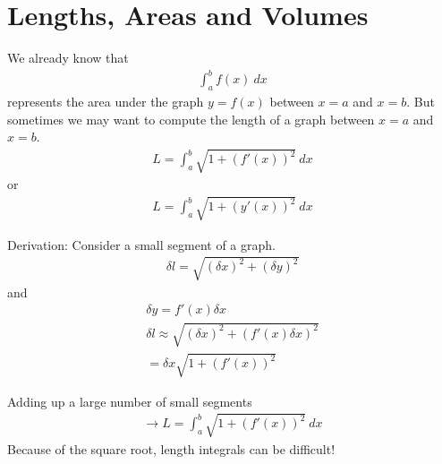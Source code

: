 \section{Lengths, Areas and Volumes}
We already know that
\begin{align*}
\int_a^b f(x) ~dx
\end{align*}
represents the area under the graph $y=f(x)$ between $x=a$ and $x=b$. But sometimes we may want to compute the length of a graph between $x=a$ and $x=b$.
\begin{align*}
L = \int_a^b \sqrt{1+ (f'(x))^2} ~dx 
\end{align*}
or 
\begin{align*}
L = \int_a^b \sqrt{1+(y'(x))^2} ~dx
\end{align*}

Derivation:
Consider a small segment of a graph.
\begin{align*}
\delta l = \sqrt{(\delta x)^2 + (\delta y)^2}
\end{align*}
and
\begin{align*}
\delta y = f'(x) \delta x \\
\delta l \approx \sqrt{(\delta x)^2 + (f'(x) \delta x)^2} \\
= \delta x \sqrt{1+(f'(x))^2}
\end{align*}

Adding up a large number of small segments
\begin{align*}
\to L = \int_a^b \sqrt{1+(f'(x))^2} ~ dx
\end{align*}
Because of the square root, length integrals can be difficult!

